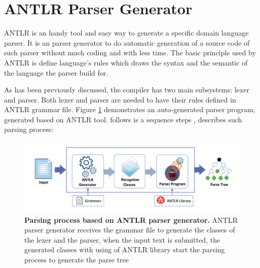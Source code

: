 \section{ANTLR Parser Generator}
\label{sec:bck_ANTLR}

ANTLR is an handy tool and easy way to generate a specific domain language parser. It is an parser generator to do automatic generation of a source code of such parser without much coding and with less time. The basic principle used by ANTLR is define language's rules which draws the syntax and the semantic of the language the parser build for. 
\par
 As has been previously discussed, the compiler has two main subsystems: lexer and parser. Both lexer and parser are needed to have their rules defined in ANTLR grammar file.  {Figure \ref{Fig:ANTLR}} demonstrates an auto-generated parser program, generated based on ANTLR tool. follows is a sequence steps \citealp{ANTLR:Tool:Online}, describes such parsing process:

\begin{figure}[ht]
	\begin{center}
		\setlength\belowcaptionskip{-7mm}
		\includegraphics[scale=0.6]{images/ANTLR}
		\caption{\textbf{Parsing process based on ANTLR parser generator.} ANTLR parser generator receives the grammar file to generate the classes of the lexer and the parser, when the input text is submitted, the generated classes with using of ANTLR library start the parsing process to generate the parse tree}
		\label{Fig:ANTLR}
	\end{center}
\end{figure}


